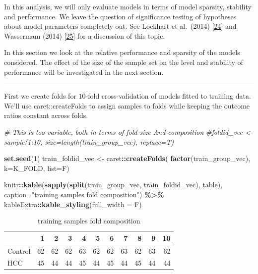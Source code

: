 \documentclass[
]{book}
\newenvironment{Shaded}{\begin{snugshade}}{\end{snugshade}}
\newcommand{\CommentTok}[1]{\textcolor[rgb]{0.56,0.35,0.01}{\textit{#1}}}
\newcommand{\DataTypeTok}[1]{\textcolor[rgb]{0.13,0.29,0.53}{#1}}
\newcommand{\DecValTok}[1]{\textcolor[rgb]{0.00,0.00,0.81}{#1}}
\newcommand{\KeywordTok}[1]{\textcolor[rgb]{0.13,0.29,0.53}{\textbf{#1}}}
\newcommand{\NormalTok}[1]{#1}
\newcommand{\OperatorTok}[1]{\textcolor[rgb]{0.81,0.36,0.00}{\textbf{#1}}}
\newcommand{\StringTok}[1]{\textcolor[rgb]{0.31,0.60,0.02}{#1}}
\begin{document}
In this analysis, we will only evaluate models in terms of
model sparsity, stability and performance. We leave the question
of significance testing of hypotheses about model parameters
completely out. See Lockhart et al.~(2014) {[}\protect\hyperlink{ref-Lockhart:2014aa}{24}{]}
and Wassermam (2014) {[}\protect\hyperlink{ref-Wasserman:2014aa}{25}{]} for a discussion of this topic.

In this section we look at the relative performance and sparsity of the models
considered. The effect of the size of the sample set on the level and
stability of performance will be investigated in the next section.

\begin{center}\rule{0.5\linewidth}{0.5pt}\end{center}

First we create folds for \(10\)-fold cross-validation of models fitted to
training data. We'll use caret::createFolds to assign samples
to folds while keeping the outcome ratios constant across folds.

\begin{Shaded}
\begin{Highlighting}[]
\CommentTok{\# This is too variable, both in terms of fold size And composition}
\CommentTok{\#foldid\_vec <{-} sample(1:10, size=length(train\_group\_vec), replace=T)}

\KeywordTok{set.seed}\NormalTok{(}\DecValTok{1}\NormalTok{)}
\NormalTok{train\_foldid\_vec <{-}}\StringTok{ }\NormalTok{caret}\OperatorTok{::}\KeywordTok{createFolds}\NormalTok{(}
 \KeywordTok{factor}\NormalTok{(train\_group\_vec), }
 \DataTypeTok{k=}\NormalTok{K\_FOLD,}
 \DataTypeTok{list=}\NormalTok{F)}

\NormalTok{knitr}\OperatorTok{::}\KeywordTok{kable}\NormalTok{(}\KeywordTok{sapply}\NormalTok{(}\KeywordTok{split}\NormalTok{(train\_group\_vec, train\_foldid\_vec), }
\NormalTok{  table), }\DataTypeTok{caption=}\StringTok{"training samples fold composition"}\NormalTok{) }\OperatorTok{\%>\%}
\StringTok{   }\NormalTok{kableExtra}\OperatorTok{::}\KeywordTok{kable\_styling}\NormalTok{(}\DataTypeTok{full\_width =}\NormalTok{ F)}
\end{Highlighting}
\end{Shaded}

\begin{table}

\caption{\label{tab:getTrainFolds}training samples fold composition}
\centering
\begin{tabular}[t]{l|r|r|r|r|r|r|r|r|r|r}
\hline
  & 1 & 2 & 3 & 4 & 5 & 6 & 7 & 8 & 9 & 10\\
\hline
Control & 62 & 62 & 62 & 63 & 62 & 62 & 63 & 62 & 63 & 62\\
\hline
HCC & 45 & 44 & 44 & 45 & 44 & 45 & 44 & 45 & 44 & 44\\
\hline
\end{tabular}
\end{table}
\end{document}
